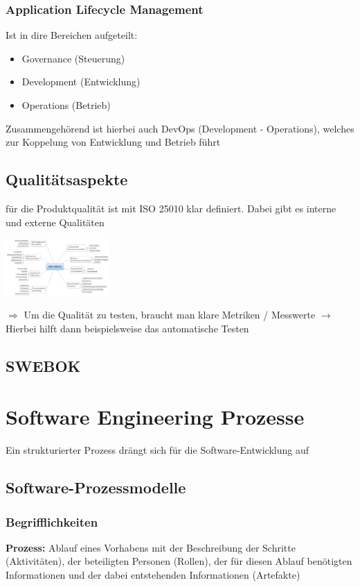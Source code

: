 \documentclass{report}
\newenvironment{Figure}
	{\par\medskip\noindent\minipage{\linewidth}}
	{\endminipage\par\medskip}
\theoremstyle{definition}
\theoremstyle{example}
\begin{document}
\subsection{Application Lifecycle Management}
Ist in dire Bereichen aufgeteilt:
\begin{itemize}
   \item Governance (Steuerung)
   \item Development (Entwicklung)
   \item Operations (Betrieb)
\end{itemize}

Zusammengehörend ist hierbei auch DevOps (Development - Operations), welches zur Koppelung von Entwicklung und Betrieb führt

\section{Qualitätsaspekte}
für die Produktqualität ist mit ISO 25010 klar definiert. Dabei gibt es interne und externe Qualitäten 

\begin{Figure}
   \centering
    \includegraphics[width=150px]{img/ISO25010.png}
        \label{fig:Qualitaet gemaess ISO 25010}
\end{Figure}
$\Rightarrow$ Um die Qualität zu testen, braucht man klare Metriken / Messwerte $\rightarrow$ Hierbei hilft dann beispielsweise das automatische Testen 


\section{SWEBOK}

\chapter{Software Engineering Prozesse}
Ein strukturierter Prozess drängt sich für die Software-Entwicklung auf

\section{Software-Prozessmodelle}
   \subsection{Begrifflichkeiten}
\textbf{Prozess:} Ablauf eines Vorhabens mit der Beschreibung der Schritte (Aktivitäten), der beteiligten Personen (Rollen),
der für diesen Ablauf benötigten Informationen und der dabei entstehenden Informationen (Artefakte)\\
\end{document}
